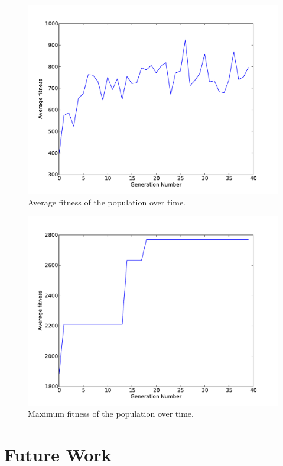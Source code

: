 \documentclass{article}
\begin{document}
\begin{figure}
	\center
	\includegraphics[width=.8\textwidth]{images/fitness}
	\caption{Average fitness of the population over time.}
	\label{fig:avg}
\end{figure}

\begin{figure}
	\center
	\includegraphics[width=.8\textwidth]{images/max_fitness}
	\caption{Maximum fitness of the population over time.}
	\label{fig:max}
\end{figure}


 

\section{Future Work}
 
\end{document}
